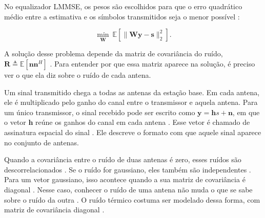 No equalizador LMMSE, os pesos são escolhidos para que o erro quadrático médio entre a estimativa e os símbolos transmitidos seja o menor possível \cite{zhao-lmmse}:

$$
\min_{\mathbf{W}}\ \mathbb{E}\left[\|\mathbf{W}\mathbf{y}-\mathbf{s}\|_2^2\right].
$$

A solução desse problema depende da matriz de covariância do ruído, $\mathbf{R}\triangleq\mathbb{E}[\mathbf{n}\mathbf{n}^H]$ \cite{zhao-lmmse}. Para entender por que essa matriz aparece na solução, é preciso ver o que ela diz sobre o ruído de cada antena.



Um sinal transmitido chega a todas as antenas da estação base. Em cada antena, ele é multiplicado pelo ganho do canal entre o transmissor e aquela antena. Para um único transmissor, o sinal recebido pode ser escrito como $\mathbf{y}=\mathbf{h}s+\mathbf{n}$, em que o vetor $\mathbf{h}$ reúne os ganhos do canal em cada antena \cite[p.~297]{tse-viswanath}. Esse vetor é chamado de assinatura espacial do sinal \cite[p.~297]{tse-viswanath}. Ele descreve o formato com que aquele sinal aparece no conjunto de antenas.



Quando a covariância entre o ruído de duas antenas é zero, esses ruídos são descorrelacionados \cite[p.~202]{haykin-sistemas}. Se o ruído for gaussiano, eles também são independentes \cite[p.~222]{haykin-sistemas}. Para um vetor gaussiano, isso acontece quando a sua matriz de covariância é diagonal \cite[p.~499]{tse-viswanath}. Nesse caso, conhecer o ruído de uma antena não muda o que se sabe sobre o ruído da outra \cite[p.~196]{haykin-sistemas}. O ruído térmico costuma ser modelado dessa forma, com matriz de covariância diagonal \cite{zhao-lmmse}.

